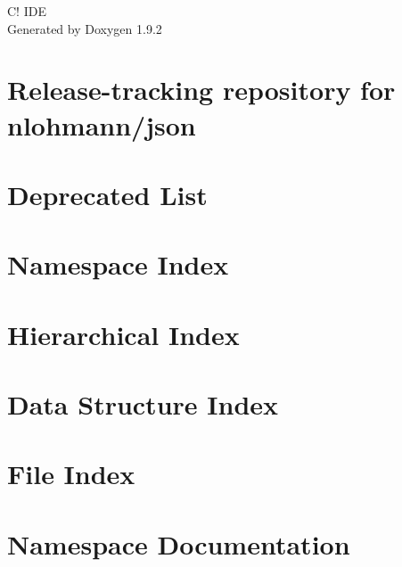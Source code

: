 \documentclass[twoside]{book}
\newcommand{\+}{\discretionary{\mbox{\scriptsize$\hookleftarrow$}}{}{}}
\newcommand{\clearemptydoublepage}{%
    \newpage{\pagestyle{empty}\cleardoublepage}%
  }
\begin{document}
  \raggedbottom
    \hypersetup{pageanchor=false,
                bookmarksnumbered=true,
                pdfencoding=unicode
               }
  \begin{titlepage}
  \vspace*{7cm}
  \begin{center}%
  {\Large C! IDE}\\
  \vspace*{1cm}
  {\large Generated by Doxygen 1.9.2}\\
  \end{center}
  \end{titlepage}
  \clearemptydoublepage
  \tableofcontents
  \clearemptydoublepage
  \hypersetup{pageanchor=true}
\chapter{Release-\/tracking repository for nlohmann/json}
\label{md_cmake_build_debug__deps_json_src_README}

\chapter{Deprecated List}
\label{deprecated}

\chapter{Namespace Index}

\chapter{Hierarchical Index}

\chapter{Data Structure Index}

\chapter{File Index}

\chapter{Namespace Documentation}





\end{document}
